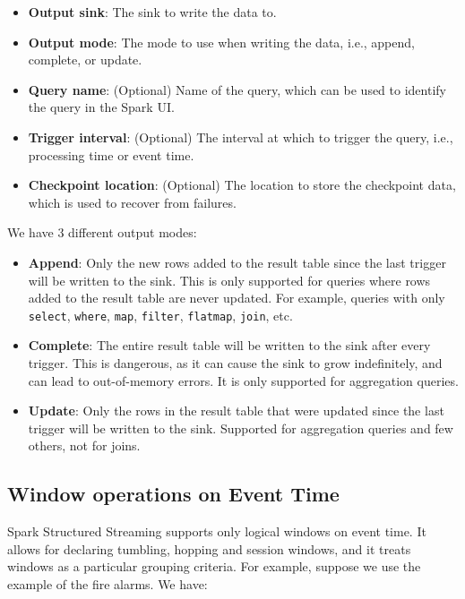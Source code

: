 \begin{itemize}
    \item \textbf{Output sink}: The sink to write the data to.
    \item \textbf{Output mode}: The mode to use when writing the data, i.e., append, complete, or update.
    \item \textbf{Query name}: (Optional) Name of the query, which can be used to identify the query in the Spark UI.
    \item \textbf{Trigger interval}: (Optional) The interval at which to trigger the query, i.e., processing time or event time.
    \item \textbf{Checkpoint location}: (Optional) The location to store the checkpoint data, which is used to recover from failures.
\end{itemize}

We have 3 different output modes:

\begin{itemize}
    \item \textbf{Append}: Only the new rows added to the result table since the last trigger will be written to the sink.
    This is only supported for queries where rows added to the result table are never updated. For example,
    queries with only \texttt{select}, \texttt{where}, \texttt{map}, \texttt{filter}, \texttt{flatmap}, \texttt{join}, etc.
    \item \textbf{Complete}: The entire result table will be written to the sink after every trigger.
    This is dangerous, as it can cause the sink to grow indefinitely, and can lead to out-of-memory errors.
    It is only supported for aggregation queries.
    \item \textbf{Update}: Only the rows in the result table that were updated since the last trigger will be written to the sink.
    Supported for aggregation queries and few others, not for joins.
\end{itemize}


\subsection{Window operations on Event Time}

Spark Structured Streaming supports only logical windows on event time. It allows for declaring 
tumbling, hopping and session windows, and it treats windows as a particular grouping criteria.
For example, suppose we use the example of the fire alarms. We have:\\

